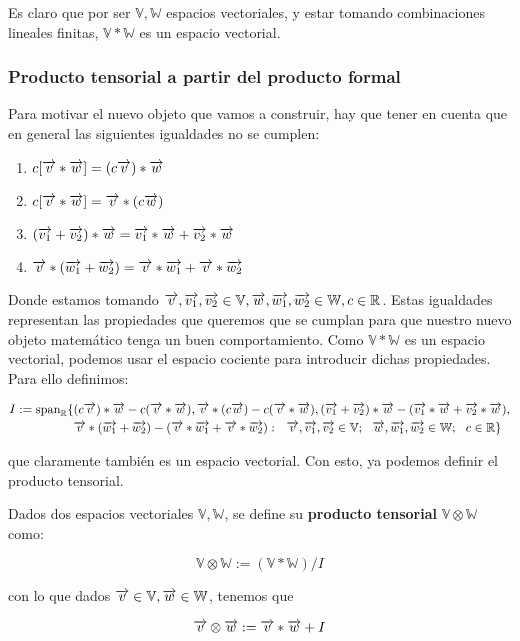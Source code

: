 Es claro que por ser $\mathbb{V}, \mathbb{W}$ espacios vectoriales, y estar tomando combinaciones lineales finitas, $\mathbb{V} \ast \mathbb{W}$ es un espacio vectorial.

\subsubsection{Producto tensorial a partir del producto formal} \label{sec:cociente_prod_formal}

Para motivar el nuevo objeto que vamos a construir, hay que tener en cuenta que en general las siguientes igualdades no se cumplen:

\begin{enumerate}
	\item $c [\overrightarrow{v} \ast \overrightarrow{w}] = (c\overrightarrow{v}) \ast \overrightarrow{w}$
	\item $c[\overrightarrow{v} \ast \overrightarrow{w}] = \overrightarrow{v} \ast (c\overrightarrow{w})$
	\item $(\overrightarrow{v_1} + \overrightarrow{v_2}) \ast \overrightarrow{w} = \overrightarrow{v_1} \ast \overrightarrow{w} + \overrightarrow{v_2} \ast \overrightarrow{w}$
	\item $\overrightarrow{v} \ast (\overrightarrow{w_1} + \overrightarrow{w_2}) = \overrightarrow{v} \ast \overrightarrow{w_1} + \overrightarrow{v} \ast \overrightarrow{w_2}$
\end{enumerate}

Donde estamos tomando $\overrightarrow{v}, \overrightarrow{v_1}, \overrightarrow{v_2} \in \mathbb{V}, \overrightarrow{w}, \overrightarrow{w_1}, \overrightarrow{w_2} \in \mathbb{W}, c \in \mathbb{R}$. Estas igualdades representan las propiedades que queremos que se cumplan para que nuestro nuevo objeto matemático tenga un buen comportamiento. Como $\mathbb{V} \ast \mathbb{W}$ es un espacio vectorial, podemos usar el espacio cociente para introducir dichas propiedades. Para ello definimos:

\begin{equation}
	\begin{split}
		I := \text{span}_{\mathbb{R}} \{  &
			(c\overrightarrow{v}) \ast \overrightarrow{w} - c(\overrightarrow{v} \ast \overrightarrow{w}), \overrightarrow{v} \ast (c\overrightarrow{w}) - c(\overrightarrow{v} \ast \overrightarrow{w}), (\overrightarrow{v_1} + \overrightarrow{v_2}) \ast \overrightarrow{w} - (\overrightarrow{v_1} \ast \overrightarrow{w} + \overrightarrow{v_2} \ast \overrightarrow{w}), \\
			& \overrightarrow{v} \ast (\overrightarrow{w_1} + \overrightarrow{w_2}) - (\overrightarrow{v} \ast \overrightarrow{w_1} + \overrightarrow{v} \ast \overrightarrow{w_2}): \ \  \overrightarrow{v}, \overrightarrow{v_1}, \overrightarrow{v_2} \in \mathbb{V}; \ \  \overrightarrow{w}, \overrightarrow{w_1}, \overrightarrow{w_2} \in \mathbb{W}; \ \  c \in \mathbb{R}  \}
	\end{split}
\end{equation}

que claramente también es un espacio vectorial. Con esto, ya podemos definir el producto tensorial.

\begin{definicion}
	Dados dos espacios vectoriales $\mathbb{V}, \mathbb{W}$, se define su \textbf{producto tensorial} $\mathbb{V} \otimes \mathbb{W}$ como:

	$$\mathbb{V} \otimes \mathbb{W} := (\mathbb{V} \ast \mathbb{W}) / I$$

	con lo que dados $\overrightarrow{v} \in \mathbb{V}, \overrightarrow{w} \in \mathbb{W}$, tenemos que

	\begin{equation}
		\overrightarrow{v} \otimes \overrightarrow{w} := \overrightarrow{v} \ast \overrightarrow{w} + I
	\end{equation}
\end{definicion}

